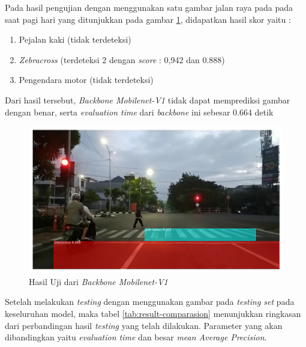 Pada hasil pengujian dengan menggunakan satu gambar jalan raya pada pada saat pagi hari yang ditunjukkan pada gambar \ref{fig:hasil-mobilenetv1}, didapatkan hasil skor yaitu :
\begin{enumerate}[nolistsep]
	\item Pejalan kaki (tidak terdeteksi)
	\item \textit{Zebracross} (terdeteksi 2  dengan \textit{score} : 0,942 dan 0.888)
	\item Pengendara motor (tidak terdeteksi)
\end{enumerate}
Dari hasil tersebut, \textit{Backbone Mobilenet-V1} tidak dapat memprediksi gambar dengan benar, serta \textit{evaluation time} dari \textit{backbone} ini sebesar 0.664 detik
\begin{figure}[h] 
	\centering
	\includegraphics[scale=0.3]{gambar/fajar-frame800-mobilenetv1.png}
	\caption{Hasil Uji dari \textit{Backbone Mobilenet-V1}}
	\label{fig:hasil-mobilenetv1}
\end{figure}

Setelah melakukan \textit{testing} dengan menggunakan gambar pada \textit{testing set} pada keseluruhan model, maka tabel \ref{tab:result-comparasion} menunjukkan ringkasan dari perbandingan hasil \textit{testing} yang telah dilakukan. Parameter yang akan dibandingkan yaitu \textit{evaluation time} dan besar \textit{mean Average Precision}.

\begin{table}[h]
	\centering
	\caption{tabel Perbandingan Hasil \textit{Testing}}
	\label{tab:result-comparasion}
\end{table}

